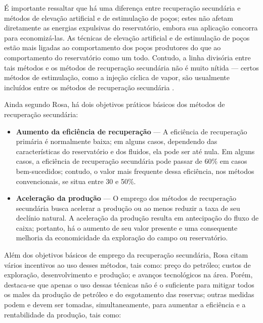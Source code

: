 \'{E} importante ressaltar que h\'{a} uma diferen\c{c}a entre recupera\c{c}\~{a}o secund\'{a}ria e m\'{e}todos de eleva\c{c}\~{a}o artificial e de estimula\c{c}\~{a}o de po\c{c}os; estes n\~{a}o afetam diretamente as energias expulsivas do reservat\'{o}rio, embora sua aplica\c{c}\~{a}o concorra para economiz\'{a}-las. As t\'{e}cnicas de eleva\c{c}\~{a}o artificial e de estimula\c{c}\~{a}o de po\c{c}os est\~{a}o mais ligadas ao comportamento dos po\c{c}os produtores do que ao comportamento do reservat\'{o}rio como um todo. Contudo, a linha divis\'{o}ria entre tais m\'{e}todos e os m\'{e}todos de recupera\c{c}\~{a}o secund\'{a}ria n\~{a}o \'{e} muito n\'{i}tida --- certos m\'{e}todos de estimula\c{c}\~{a}o, como a inje\c{c}\~{a}o c\'{i}clica de vapor, s\~{a}o usualmente inclu\'{i}dos entre os m\'{e}todos de recupera\c{c}\~{a}o secund\'{a}ria \cite{engres}.

Ainda segundo Rosa, h\'{a} dois objetivos pr\'{a}ticos b\'{a}sicos dos m\'{e}todos de recupera\c{c}\~{a}o secund\'{a}ria:

\begin{itemize}
\item \textbf{Aumento da efici\^{e}ncia de recupera\c{c}\~{a}o} --- A efici\^{e}ncia de recupera\c{c}\~{a}o prim\'{a}ria \'{e} normalmente baixa; em alguns casos, dependendo das caracter\'{i}sticas do reservat\'{o}rio e dos fluidos, ela pode ser at\'{e} nula. Em alguns casos, a efici\^{e}ncia de recupera\c{c}\~{a}o secund\'{a}ria pode passar de 60\% em casos bem-sucedidos; contudo, o valor mais frequente dessa efici\^{e}ncia, nos m\'{e}todos convencionais, se situa entre 30 e 50\%.
\item \textbf{Acelera\c{c}\~{a}o da produ\c{c}\~{a}o} --- O emprego dos m\'{e}todos de recupera\c{c}\~{a}o secund\'{a}ria busca acelerar a produ\c{c}\~{a}o ou ao menos reduzir a taxa de seu decl\'{i}nio natural. A acelera\c{c}\~{a}o da produ\c{c}\~{a}o resulta em antecipa\c{c}\~{a}o do fluxo de caixa; portanto, h\'{a} o aumento de seu valor presente e uma consequente melhoria da economicidade da explora\c{c}\~{a}o do campo ou reservat\'{o}rio.
\end{itemize}

Al\'{e}m dos objetivos b\'{a}sicos de emprego da recupera\c{c}\~{a}o secund\'{a}ria, Rosa citam v\'{a}rios incentivos ao uso desses m\'{e}todos, tais como: pre\c{c}o do petr\'{o}leo; custos de explora\c{c}\~{a}o, desenvolvimento e produ\c{c}\~{a}o; e avan\c{c}os tecnol\'{o}gicos na \'{a}rea. Por\'{e}m, destaca-se que apenas o uso dessas t\'{e}cnicas n\~{a}o \'{e} o suficiente para mitigar todos os males da produ\c{c}\~{a}o de petr\'{o}leo e do esgotamento das reservas; outras medidas podem e devem ser tomadas, simultaneamente, para aumentar a efici\^{e}ncia e a rentabilidade da produ\c{c}\~{a}o, tais como:

